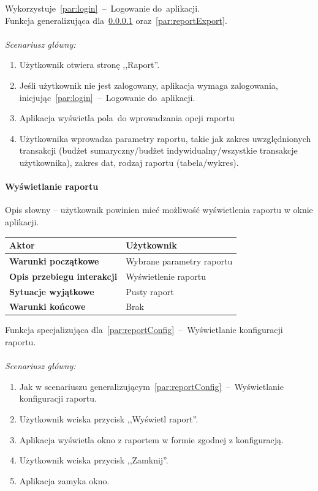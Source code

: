 Wykorzystuje~\ref{par:login}~--~Logowanie do~aplikacji.\\
\indent Funkcja generalizująca dla~\ref{par:reportView} oraz~\ref{par:reportExport}.\\\\
\textit{Scenariusz główny:}
\begin{enumerate}
  \item Użytkownik otwiera stronę ,,Raport''.
  \item Jeśli użytkownik nie jest zalogowany, aplikacja wymaga zalogowania, inicjując~\ref{par:login}~--~Logowanie do~aplikacji.
  \item Aplikacja wyświetla pola~do wprowadzania opcji raportu
  \item Użytkownika wprowadza parametry raportu, takie jak zakres uwzględnionych transakcji (budżet sumaryczny/budżet indywidualny/wszystkie transakcje użytkownika), zakres dat, rodzaj raportu (tabela/wykres).
\end{enumerate}

\paragraph{Wyświetlanie raportu\newline}
\label{par:reportView}

Opis słowny -- użytkownik powinien mieć możliwość wyświetlenia raportu w oknie aplikacji.

\begin{longtable}{|p{5cm}|p{7cm}|}
 	\hline
	\textbf{Aktor} & Użytkownik \\
	\hline
	\textbf{Warunki początkowe} & Wybrane parametry raportu \\
	\hline
	\textbf{Opis przebiegu interakcji} & Wyświetlenie raportu \\
	\hline
	\textbf{Sytuacje wyjątkowe} & Pusty raport \\
	\hline
	\textbf{Warunki końcowe} & Brak \\
	\hline
\end{longtable}

\indent Funkcja specjalizująca dla~\ref{par:reportConfig}~--~Wyświetlanie konfiguracji raportu.\\\\
\textit{Scenariusz główny:}
\begin{enumerate}
  \item[1-4.] Jak w scenariuszu generalizującym~\ref{par:reportConfig}~--~Wyświetlanie konfiguracji raportu.
  \item[5.] Użytkownik wciska przycisk ,,Wyświetl raport''.
  \item[6.] Aplikacja wyświetla okno z raportem w formie zgodnej z konfiguracją.
  \item[7.] Użytkownik wciska przycisk ,,Zamknij''.
  \item[8.] Aplikacja zamyka okno.
\end{enumerate}

